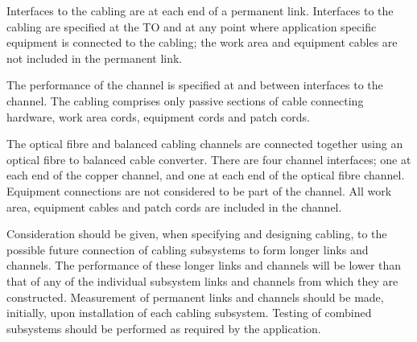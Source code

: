 Interfaces to the cabling are at each end of a permanent link. Interfaces to the cabling are
specified at the TO and at any point where application specific equipment is connected to the
cabling; the work area and equipment cables are not included in the permanent link.\par

The performance of the channel is specified at and between interfaces to the channel. The
cabling comprises only passive sections of cable connecting hardware, work area cords, equipment
cords and patch cords.\par

The optical fibre and balanced cabling channels are connected together using an optical fibre to
balanced cable converter. There are four channel interfaces; one at each end of the copper channel,
and one at each end of the optical fibre channel. Equipment connections are not considered to be
part of the channel. All work area, equipment cables and patch cords are included in the channel.\par

Consideration should be given, when specifying and designing cabling, to the possible future
connection of cabling subsystems to form longer links and channels. The performance of these
longer links and channels will be lower than that of any of the individual subsystem links and
channels from which they are constructed. Measurement of permanent links and channels should be
made, initially, upon installation of each cabling subsystem. Testing of combined subsystems
should be performed as required by the application.\par


